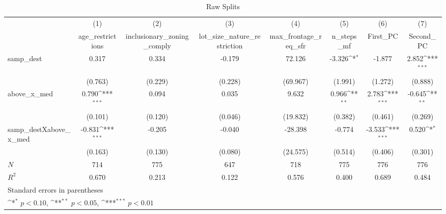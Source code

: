 \begin{table}[htbp]\centering
\def\sym#1{\ifmmode^{#1}\else\(^{#1}\)\fi}
\caption{Raw Splits}
\begin{tabular}{l*{7}{c}}
\hline\hline
            &\multicolumn{1}{c}{(1)}&\multicolumn{1}{c}{(2)}&\multicolumn{1}{c}{(3)}&\multicolumn{1}{c}{(4)}&\multicolumn{1}{c}{(5)}&\multicolumn{1}{c}{(6)}&\multicolumn{1}{c}{(7)}\\
            &\multicolumn{1}{c}{age\_restrictions}&\multicolumn{1}{c}{inclusionary\_zoning\_comply}&\multicolumn{1}{c}{lot\_size\_nature\_restriction}&\multicolumn{1}{c}{max\_frontage\_req\_sfr}&\multicolumn{1}{c}{n\_steps\_mf}&\multicolumn{1}{c}{First\_PC}&\multicolumn{1}{c}{Second\_PC}\\
\hline
samp\_dest   &       0.317         &       0.334         &      -0.179         &      72.126         &      -3.326\sym{*}  &      -1.877         &       2.852\sym{***}\\
            &     (0.763)         &     (0.229)         &     (0.228)         &    (69.967)         &     (1.991)         &     (1.272)         &     (0.888)         \\
[1em]
above\_x\_med &       0.790\sym{***}&       0.094         &       0.035         &       9.632         &       0.966\sym{**} &       2.783\sym{***}&      -0.645\sym{**} \\
            &     (0.101)         &     (0.120)         &     (0.046)         &    (19.832)         &     (0.382)         &     (0.461)         &     (0.269)         \\
[1em]
samp\_destXabove\_x\_med&      -0.831\sym{***}&      -0.205         &      -0.040         &     -28.398         &      -0.774         &      -3.533\sym{***}&       0.520\sym{*}  \\
            &     (0.163)         &     (0.130)         &     (0.080)         &    (24.575)         &     (0.514)         &     (0.406)         &     (0.301)         \\
\hline
\(N\)       &         714         &         775         &         647         &         718         &         775         &         776         &         776         \\
\(R^{2}\)   &       0.670         &       0.213         &       0.122         &       0.576         &       0.400         &       0.689         &       0.484         \\
\hline\hline
\multicolumn{8}{l}{\footnotesize Standard errors in parentheses}\\
\multicolumn{8}{l}{\footnotesize \sym{*} \(p<0.10\), \sym{**} \(p<0.05\), \sym{***} \(p<0.01\)}\\
\end{tabular}
\end{table}
